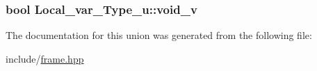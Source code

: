 \hypertarget{unionLocal__var__Type__u_a8e62ef040320789080808dcdea5eb550}{
\subsubsection[{void\+\_\+v}]{\setlength{\rightskip}{0pt plus 5cm}bool Local\+\_\+var\+\_\+\+Type\+\_\+u\+::void\+\_\+v}}\label{unionLocal__var__Type__u_a8e62ef040320789080808dcdea5eb550}


The documentation for this union was generated from the following file\+:\begin{DoxyCompactItemize}
\item 
include/\hyperlink{frame_8hpp}{frame.\+hpp}\end{DoxyCompactItemize}

